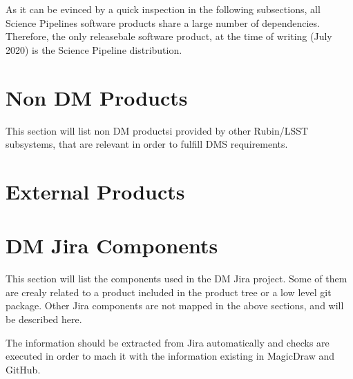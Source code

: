 As it can be evinced by a quick inspection in the following subsections, 
all Science Pipelines software products share a large number of dependencies. 
Therefore, the only releasebale software product, at the time of writing (July 2020) 
is the Science Pipeline distribution.




\newpage
\section{Non DM Products}\label{sec:nondm}

This section will list non DM productsi provided by other Rubin/LSST subsystems,  that are relevant in order to fulfill DMS requirements.


\newpage
\section{External Products}\label{sec:externals}




\newpage
\section{DM Jira Components}\label{sec:jiracomponents}

This section will list the components used in the DM Jira project.
Some of them are crealy related to a product included in the product tree or a low level git package.
Other Jira components are not mapped in the above sections, and will be described here.

The information should be extracted from Jira automatically and checks are executed in order to mach it with the information existing in MagicDraw and GitHub.
